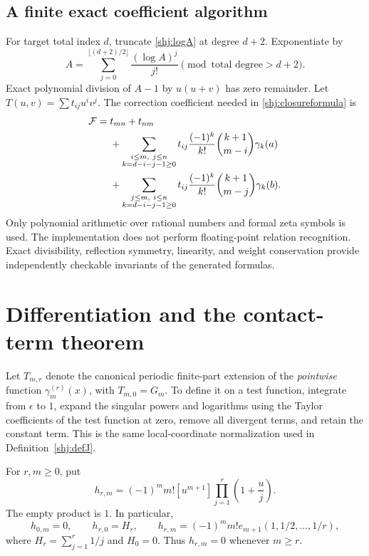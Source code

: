 \subsection{A finite exact coefficient algorithm}
For target total index $d$, truncate \eqref{shj:logA} at degree $d+2$. Exponentiate by
\[
A=\sum_{j=0}^{\lfloor(d+2)/2\rfloor}\frac{(\log A)^j}{j!}
\pmod{\text{total degree}>d+2}.
\]
Exact polynomial division of $A-1$ by $u(u+v)$ has zero remainder. Let
$T(u,v)=\sum t_{ij}u^iv^j$. The correction coefficient needed in \eqref{shj:closureformula} is
\begin{align}
[u^mv^n]\mathcal F={}&t_{mn}+t_{nm}\notag\\
&+\sum_{\substack{i\le m,\ j\le n\\k=d-i-j-1\ge0}}
 t_{ij}\frac{(-1)^k}{k!}\binom{k+1}{m-i}\gamma_k(a)\notag\\
&+\sum_{\substack{j\le m,\ i\le n\\k=d-i-j-1\ge0}}
 t_{ij}\frac{(-1)^k}{k!}\binom{k+1}{m-j}\gamma_k(b).
\label{shj:coefficientalgorithm}
\end{align}
Only polynomial arithmetic over rational numbers and formal zeta symbols is used. The implementation does not perform floating-point relation recognition. Exact divisibility, reflection symmetry, linearity, and weight conservation provide independently checkable invariants of the generated formulas.

\section{Differentiation and the contact-term theorem}\label{shj:contacts}
Let $T_{m,r}$ denote the canonical periodic finite-part extension of the \emph{pointwise} function $\gamma_m^{(r)}(x)$, with $T_{m,0}=G_m$. To define it on a test function, integrate from $\epsilon$ to $1$, expand the singular powers and logarithms using the Taylor coefficients of the test function at zero, remove all divergent terms, and retain the constant term. This is the same local-coordinate normalization used in Definition~\ref{shj:defJ}.

For $r,m\ge0$, put
\begin{equation}\label{shj:hdef}
h_{r,m}=(-1)^m m![u^{m+1}]\prod_{j=1}^r\left(1+\frac uj\right).
\end{equation}
The empty product is $1$. In particular,
\[
h_{0,m}=0,\qquad h_{r,0}=H_r,\qquad
h_{r,m}=(-1)^m m!e_{m+1}(1,1/2,\ldots,1/r),
\]
where $H_r=\sum_{j=1}^r1/j$ and $H_0=0$. Thus $h_{r,m}=0$ whenever $m\ge r$.

